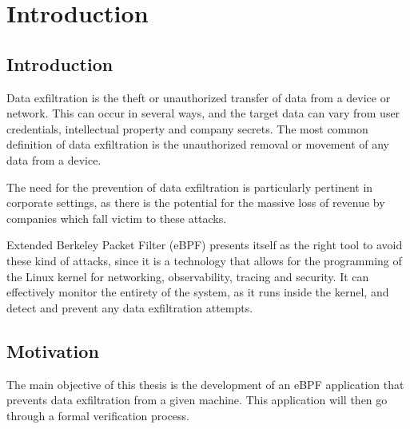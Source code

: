 \chapter{Introduction}
\label{chap:int}


\section{Introduction}

Data exfiltration is the theft or unauthorized transfer of data from a device or network. This can occur in several ways, and the target data can vary from user credentials, intellectual property and company secrets.
The most common definition of data exfiltration is the unauthorized removal or movement of any data from a device.

The need for the prevention of data exfiltration is particularly pertinent in corporate settings, as there is the potential for the massive loss of revenue by companies which fall victim to these attacks. 

Extended Berkeley Packet Filter (eBPF) presents itself as the right tool to avoid these kind of attacks, since it is a technology that allows for the programming of the Linux kernel for networking, observability, tracing and security. It can effectively monitor the entirety of the system, as it runs inside the kernel, and detect and prevent any data exfiltration attempts.

\section{Motivation}

The main objective of this thesis is the development of an eBPF application that prevents data exfiltration from a given machine. This application will then go through a formal verification process. 

